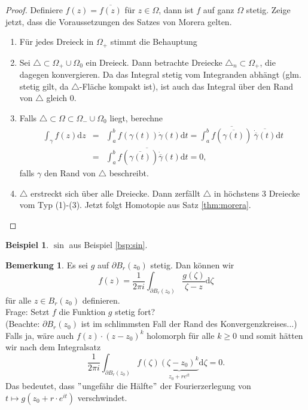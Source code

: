 \documentclass[11pt,titlepage]{article}
\theoremstyle{definition}
\newtheorem{example}[theorem]{Beispiel}
\newtheorem{remark}[theorem]{Bemerkung}
\theoremstyle{remark}
\begin{document}
	\begin{proof}
		Definiere $f(z)=\overline{f(z)}$ für $z\in\Omega$, dann ist $f$ auf ganz $\Omega$ stetig. 
		Zeige jetzt, dass die Voraussetzungen des Satzes von Morera gelten.
		\begin{enumerate}
			\item Für jedes Dreieck in $\Omega_+$ stimmt die Behauptung
			\item Sei $\triangle\subset\Omega_+ \cup\Omega_0$ ein Dreieck. Dann betrachte 
			Dreiecke $\triangle_n\subset\Omega_+$, die dagegen konvergieren. Da das Integral 
			stetig vom Integranden abhängt (glm. stetig gilt, da $\triangle$-Fläche kompakt ist), ist 
			auch das Integral über den Rand von $\triangle$ gleich $0$.
			\item Falls $\triangle\subset\Omega\subset\Omega_- \cup\Omega_0$ liegt, berechne 
			\begin{eqnarray*}
				\int_{\gamma}f(z)\mathrm{d}z&=&\int_a^b f(\gamma(t))\dot{\gamma}(t)\mathrm{d}t =
				\int_a^b \overline{f(\overline{\gamma(t)})} \ 
				\overline{\dot{\overline{\gamma}}(t)}\mathrm{d}t \\
				&=& \overline{\int_a^b f(\overline{\gamma(t)}) \dot{\overline{\gamma}}(t)\mathrm{d}t}
				=0,
			\end{eqnarray*}
			falls $\gamma$ den Rand von $\triangle$ beschreibt.
			\item $\triangle$ erstreckt sich über alle Dreiecke. Dann zerfällt $\triangle$ in höchstens 
			3 Dreiecke vom Typ (1)-(3). Jetzt folgt Homotopie aus Satz \ref{thm:morera}.
		\end{enumerate}
	\end{proof}
	
	\begin{example}
		$\sin$ aus Beispiel \ref{bsp:sin}.
	\end{example}
	
	\begin{remark}
		Es sei $g$ auf $\partial B_r (z_0)$ stetig. Dan können wir 
		\[ f(z)=\frac{1}{2\pi i}\int_{\partial B_r (z_0)} \frac{g(\zeta)}{\zeta -z}\mathrm{d}\zeta \]
		für alle $z\in B_r(z_0)$ definieren. \\
		Frage: Setzt $f$ die Funktion $g$ stetig fort? \\
		(Beachte: $\partial B_r(z_0)$ ist im schlimmsten Fall der Rand des Konvergenzkreises...) \\
		Falls ja, wäre auch $f(z)\cdot(z-z_0)^k$ holomorph für alle $k\geq 0$ und somit hätten wir 
		nach dem Integralsatz
		\[\frac{1}{2\pi i}\int_{\partial B_r(z_0)}f(\zeta)\underbrace{(\zeta-z_0)^k}_{z_0 +re^{it}}
		\mathrm{d}\zeta =0. \]
		Das bedeutet, dass $"$ungefähr die Hälfte$"$ der Fourierzerlegung von $t\mapsto 
		g(z_0 +r\cdot e^{it})$ verschwindet.
	\end{remark}
	
\end{document}
